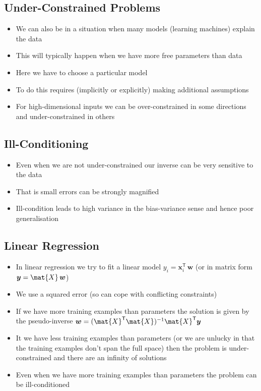\documentclass[11pt]{article}
\newcommand{\tr}{\textsf{T}}
\begin{document}
\subsection{Under-Constrained Problems}
\label{sec:orgb356d1e}
\begin{itemize}
\item We can also be in a situation when many models (learning
machines) explain the data
\item This will typically happen when we have more free parameters than data
\item Here we have to choose a particular model
\item To do this requires (implicitly or explicitly) making additional
assumptions
\item For high-dimensional inputs we can be over-constrained
in some directions and under-constrained in others
\end{itemize}

\subsection{Ill-Conditioning}
\label{sec:org8d89dc2}
\begin{itemize}
\item Even when we are not under-constrained our inverse can be very sensitive to the data
\item That is small errors can be strongly magnified
\item Ill-condition leads to high variance in the bias-variance sense and hence poor generalisation
\end{itemize}

\subsection{Linear Regression}
\label{sec:org9e30b8c}
\begin{itemize}
\item In linear regression we try to fit a linear model \(y_i = \bm{x}_i^\tr\,\bm{w}\)
(or in matrix form \(\bm{y} = \mat{X}\,\bm{w}\))
\item We use a squared error (so can cope with conflicting constraints)
\item If we have more training examples than parameters the solution is given by the pseudo-inverse
\(\bm{w} = (\mat{X}^\tr \mat{X})^{-1} \mat{X}^\tr \bm{y}\)
\item It we have less training examples than parameters (or we are
unlucky in that the training examples don't span the full space)
then the problem is under-constrained and there are an infinity
of solutions
\item Even when we have more training examples than parameters the
problem can be ill-conditioned
\end{itemize}
\end{document}
